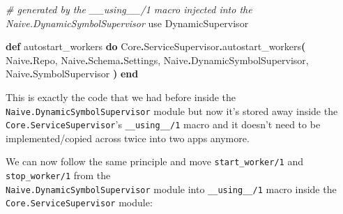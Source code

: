 \documentclass[
  oneside]{book}
\newenvironment{Shaded}{\begin{snugshade}}{\end{snugshade}}
\newcommand{\CommentTok}[1]{\textcolor[rgb]{0.56,0.35,0.01}{\textit{#1}}}
\newcommand{\ConstantTok}[1]{\textcolor[rgb]{0.56,0.35,0.01}{#1}}
\newcommand{\FunctionTok}[1]{\textcolor[rgb]{0.13,0.29,0.53}{\textbf{#1}}}
\newcommand{\ImportTok}[1]{#1}
\newcommand{\KeywordTok}[1]{\textcolor[rgb]{0.13,0.29,0.53}{\textbf{#1}}}
\newcommand{\NormalTok}[1]{#1}
\newcommand{\OperatorTok}[1]{\textcolor[rgb]{0.81,0.36,0.00}{\textbf{#1}}}
\begin{document}
\begin{Shaded}
\begin{Highlighting}[]
  \CommentTok{\# generated by the \textasciigrave{}\_\_using\_\_/1\textasciigrave{} macro injected into the \textasciigrave{}Naive.DynamicSymbolSupervisor\textasciigrave{}}
  \ImportTok{use} \ConstantTok{DynamicSupervisor}

  \KeywordTok{def}\NormalTok{ autostart\_workers }\KeywordTok{do}
    \ConstantTok{Core}\OperatorTok{.}\ConstantTok{ServiceSupervisor}\OperatorTok{.}\NormalTok{autostart\_workers}\FunctionTok{(}
      \ConstantTok{Naive}\OperatorTok{.}\ConstantTok{Repo}\NormalTok{,}
      \ConstantTok{Naive}\OperatorTok{.}\ConstantTok{Schema}\OperatorTok{.}\ConstantTok{Settings}\NormalTok{,}
      \ConstantTok{Naive}\OperatorTok{.}\ConstantTok{DynamicSymbolSupervisor}\NormalTok{,}
      \ConstantTok{Naive}\OperatorTok{.}\ConstantTok{SymbolSupervisor}
    \FunctionTok{)}
  \KeywordTok{end}
\end{Highlighting}
\end{Shaded}

This is exactly the code that we had before inside the \texttt{Naive.DynamicSymbolSupervisor} module but now it's stored away inside the \texttt{Core.ServiceSupervisor}'s \texttt{\_\_using\_\_/1} macro and it doesn't need to be implemented/copied across twice into two apps anymore.

We can now follow the same principle and move \texttt{start\_worker/1} and \texttt{stop\_worker/1} from the\\
\texttt{Naive.DynamicSymbolSupervisor} module into \texttt{\_\_using\_\_/1} macro inside the \texttt{Core.ServiceSupervisor} module:
\end{document}
